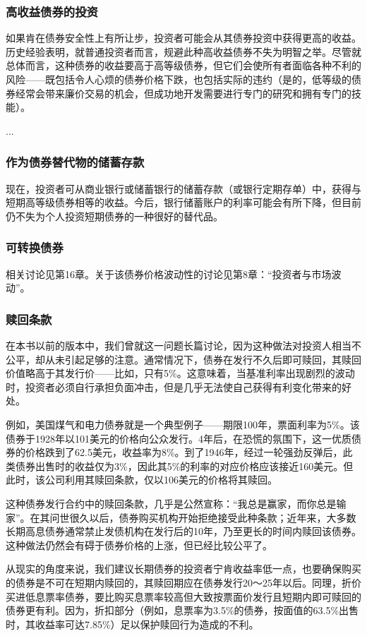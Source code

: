 \documentclass[12pt,oneside]{book}
\begin{document}
\subsubsection{高收益债券的投资}
如果肯在债券安全性上有所让步，投资者可能会从其债券投资中获得更高的收益。历史经验表明，就普通投资者而言，规避此种高收益债券不失为明智之举。尽管就总体而言，这种债券的收益要高于高等级债券，但它们会使所有者面临各种不利的风险——既包括令人心烦的债券价格下跌，也包括实际的违约（是的，低等级的债券经常会带来廉价交易的机会，但成功地开发需要进行专门的研究和拥有专门的技能）。

...
\subsubsection{作为债券替代物的储蓄存款}
现在，投资者可从商业银行或储蓄银行的储蓄存款（或银行定期存单）中，获得与短期高等级债券相等的收益。今后，银行储蓄账户的利率可能会有所下降，但目前仍不失为个人投资短期债券的一种很好的替代品。

\subsubsection{可转换债券}
相关讨论见第16章。关于该债券价格波动性的讨论见第8章：“投资者与市场波动”。

\subsubsection{赎回条款}
在本书以前的版本中，我们曾就这一问题长篇讨论，因为这种做法对投资人相当不公平，却从未引起足够的注意。通常情况下，债券在发行不久后即可赎回，其赎回价值略高于其发行价——比如，只有5\%。这意味着，当基准利率出现剧烈的波动时，投资者必须自行承担负面冲击，但是几乎无法使自己获得有利变化带来的好处。

例如，美国煤气和电力债券就是一个典型例子——期限100年，票面利率为5\%。该债券于1928年以101美元的价格向公众发行。4年后，在恐慌的氛围下，这一优质债券的价格跌到了62.5美元，收益率为8\%。到了1946年，经过一轮强劲反弹后，此类债券出售时的收益仅为3\%，因此其5\%的利率的对应价格应该接近160美元。但此时，该公司利用其赎回条款，仅以106美元的价格将其赎回。

这种债券发行合约中的赎回条款，几乎是公然宣称：“我总是赢家，而你总是输家”。在其问世很久以后，债券购买机构开始拒绝接受此种条款；近年来，大多数长期高息债券通常禁止发债机构在发行后的10年，乃至更长的时间内赎回该债券。这种做法仍然会有碍于债券价格的上涨，但已经比较公平了。

从现实的角度来说，我们建议长期债券的投资者宁肯收益率低一点，也要确保购买的债券是不可在短期内赎回的，其赎回期应在债券发行20～25年以后。同理，折价买进低息票率债券，要比购买息票率较高但大致按票面价发行且短期内即可赎回的债券更有利。因为，折扣部分（例如，息票率为3.5\%的债券，按面值的63.5\%出售时，其收益率可达7.85\%）足以保护赎回行为造成的不利。
\end{document}
